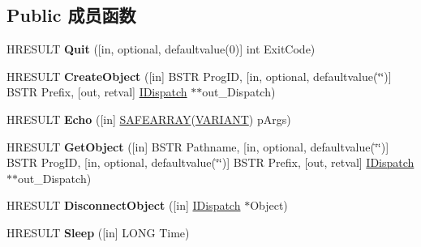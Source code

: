 \subsection*{Public 成员函数}
\begin{DoxyCompactItemize}
\item 
\mbox{\label{interface_i_host_1_1_i_host_a81a69a12262df56f5e874f221c641ccc}} 
H\+R\+E\+S\+U\+LT {\bfseries Quit} (\mbox{[}in, optional, defaultvalue(0)\mbox{]} int Exit\+Code)
\item 
\mbox{\label{interface_i_host_1_1_i_host_a986dd6cc64bbc0fcfd4a4a4f923f0113}} 
H\+R\+E\+S\+U\+LT {\bfseries Create\+Object} (\mbox{[}in\mbox{]} B\+S\+TR Prog\+ID, \mbox{[}in, optional, defaultvalue(\char`\"{}\char`\"{})\mbox{]} B\+S\+TR Prefix, \mbox{[}out, retval\mbox{]} \hyperlink{interface_i_dispatch}{I\+Dispatch} $\ast$$\ast$out\+\_\+\+Dispatch)
\item 
\mbox{\label{interface_i_host_1_1_i_host_a761a314d256069bf5a2488a7107ab74e}} 
H\+R\+E\+S\+U\+LT {\bfseries Echo} (\mbox{[}in\mbox{]} \hyperlink{structtag_s_a_f_e_a_r_r_a_y}{S\+A\+F\+E\+A\+R\+R\+AY}(\hyperlink{structtag_v_a_r_i_a_n_t}{V\+A\+R\+I\+A\+NT}) p\+Args)
\item 
\mbox{\label{interface_i_host_1_1_i_host_a8c4a556bae66772b3b5816e31d3be2ae}} 
H\+R\+E\+S\+U\+LT {\bfseries Get\+Object} (\mbox{[}in\mbox{]} B\+S\+TR Pathname, \mbox{[}in, optional, defaultvalue(\char`\"{}\char`\"{})\mbox{]} B\+S\+TR Prog\+ID, \mbox{[}in, optional, defaultvalue(\char`\"{}\char`\"{})\mbox{]} B\+S\+TR Prefix, \mbox{[}out, retval\mbox{]} \hyperlink{interface_i_dispatch}{I\+Dispatch} $\ast$$\ast$out\+\_\+\+Dispatch)
\item 
\mbox{\label{interface_i_host_1_1_i_host_abcfe9454f9fdcab46658419061a4edb9}} 
H\+R\+E\+S\+U\+LT {\bfseries Disconnect\+Object} (\mbox{[}in\mbox{]} \hyperlink{interface_i_dispatch}{I\+Dispatch} $\ast$Object)
\item 
\mbox{\label{interface_i_host_1_1_i_host_a7420873c322fcec24bc6296c8d6e5a62}} 
H\+R\+E\+S\+U\+LT {\bfseries Sleep} (\mbox{[}in\mbox{]} L\+O\+NG Time)
\item 

\end{DoxyCompactItemize}
